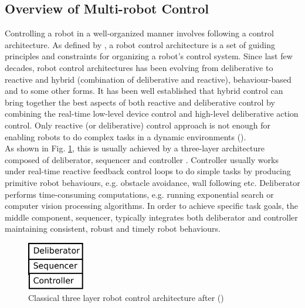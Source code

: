 \documentclass{ifacconf}
\begin{document}
\subsection{Overview of Multi-robot Control}
Controlling a robot in a well-organized manner involves following a control architecture. As defined by \cite{Mataric2007}, a robot control architecture is a set of guiding principles and constraints for organizing a robot's control system. Since last few decades, robot control architectures has been evolving from deliberative to reactive and hybrid (combination of deliberative and reactive), behaviour-based and to some other forms. It has been well established that hybrid control can bring together the best aspects of both reactive and deliberative control by combining the real-time low-level device control and high-level deliberative action control. Only reactive (or deliberative) control approach is not enough for enabling robots to do complex tasks in a dynamic environments (\cite{Gat1997}).\\
 As shown in Fig. \ref{fig:three-layer-arch}, this is usually achieved by a three-layer architecture composed of deliberator, sequencer and controller . Controller usually works under real-time reactive feedback control loops to do simple tasks by producing primitive robot behaviours, e.g. obstacle avoidance, wall following etc. Deliberator performs time-consuming computations, e.g. running exponential search or computer vision processing algorithms. In order to achieve specific task goals, the middle component, sequencer, typically integrates both deliberator and controller maintaining consistent, robust and timely robot behaviours.\\
\begin{figure}
\begin{center}
\includegraphics[width=2.5cm,height=2.1cm]{./dia-files/three-layer-arch} %
\caption{Classical three layer robot control architecture after (\cite{Gat1997})} 
\label{fig:three-layer-arch}
\end{center}
\end{figure}
\end{document}
